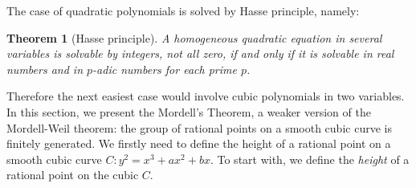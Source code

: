 \documentclass[12pt]{article}
\newtheorem{theorem}{Theorem}[subsection]
\theoremstyle{remark}
\theoremstyle{definition}
\begin{document}
        The case of quadratic polynomials is solved by Hasse principle, namely:
        \begin{theorem}[Hasse principle]
            A homogeneous quadratic equation in several variables is solvable by integers, not all zero, if and only if it is solvable in real numbers and in $p$-adic numbers for each prime $p$.
        \end{theorem}
        
        Therefore the next easiest case would involve cubic polynomials in two variables. In this section, we present the Mordell's Theorem, a weaker version of the Mordell-Weil theorem: the group of rational points on a smooth cubic curve is finitely generated. We firstly need to define the height of a rational point on a smooth cubic curve $C:y^2 = x^3 + ax^2 + bx$. To start with, we define the \textit{height} of a rational point on the cubic $C$.
        
\end{document}
